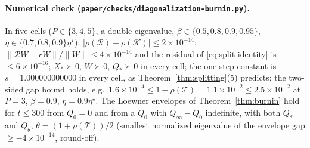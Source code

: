 \documentclass[11pt]{article}
\theoremstyle{remark}
\begin{document}
\paragraph{Numerical check (\texttt{paper/checks/diagonalization-burnin.py}).} In five cells ($P\in\{3,4,5\}$, a double eigenvalue, $\beta\in\{0.5,0.8,0.9,0.95\}$, $\eta\in\{0.7,0.8,0.9\}\eta^\star$): $|\rho(\mathcal R)-\rho(\mathcal K)|\le2\times10^{-14}$; $\|\mathcal R W-rW\|/\|W\|\le4\times10^{-14}$ and the residual of \eqref{eq:split-identity} is $\le6\times10^{-16}$; $X_*\succ0$, $W\succ0$, $Q_*\succ0$ in every cell; the one-step constant is $s=1.000000000000$ in every cell, as Theorem~\ref{thm:splitting}(5) predicts; the two-sided gap bound holds, e.g.\ $1.6\times10^{-4}\le1-\rho(\mathcal T)=1.1\times10^{-2}\le2.5\times10^{-2}$ at $P=3$, $\beta=0.9$, $\eta=0.9\eta^\star$. The Loewner envelopes of Theorem~\ref{thm:burnin} hold for $t\le300$ from $Q_0=0$ and from a $Q_0$ with $Q_\infty-Q_0$ indefinite, with both $Q_*$ and $Q_\theta$, $\theta=(1+\rho(\mathcal T))/2$ (smallest normalized eigenvalue of the envelope gap $\ge-4\times10^{-14}$, round-off).
\end{document}
